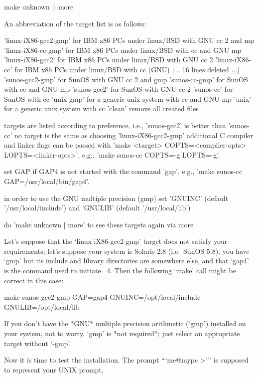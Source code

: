 \begintt
make unknown || more
\endtt

An abbreviation of the target list is as follows:

\begintt
'linux-iX86-gcc2-gmp'      for IBM x86 PCs under linux/BSD with GNU cc 2 and mp
'linux-iX86-cc-gmp'        for IBM x86 PCs under linux/BSD with cc and GNU mp
'linux-iX86-gcc2'          for IBM x86 PCs under linux/BSD with GNU cc 2
'linux-iX86-cc'            for IBM x86 PCs under linux/BSD with cc (GNU)
[... 16 lines deleted ...]
'sunos-gcc2-gmp'           for SunOS with GNU cc 2 and gmp
'sunos-cc-gmp'             for SunOS with cc and GNU mp
'sunos-gcc2'               for SunOS with GNU cc 2
'sunos-cc'                 for SunOS with cc
'unix-gmp'                 for a generic unix system with cc and GNU mp
'unix'                     for a generic unix system with cc
'clean'                    remove all created files

   targets are listed according to preference,
   i.e., 'sunos-gcc2' is better than 'sunos-cc'
   no target is the same as choosing 'linux-iX86-gcc2-gmp'
   additional C compiler and linker flags can be passed with
   'make <target> COPTS=<compiler-opts> LOPTS=<linker-opts>',
   e.g., 'make sunos-cc COPTS=-g LOPTS=-g'.

   set GAP if GAP4 is not started with the command 'gap',
   e.g., 'make sunos-cc GAP=/usr/local/bin/gap4'.

   in order to use the GNU multiple precision (gmp) set
   'GNUINC' (default '/usr/local/include') and 
   'GNULIB' (default '/usr/local/lib')

   do 'make unknown | more' to see these targets again via more
\endtt

Let's suppose that the  `linux-iX86-gcc2-gmp'  target  does  not  satisfy  your
requirements; let's suppose your system is Solaris 2.8 (i.e.~SunOS  5.8),
you have `gmp' but its include  and  library  directories  are  somewhere
else, and that `gap4' is the command used to initiate  {\GAP}~4.  Then  the
following `make' call might be correct in this case:

\begintt
make sunos-gcc2-gmp GAP=gap4 GNUINC=/opt/local/include GNULIB=/opt/local/lib
\endtt

If you  don't  have  the  *GNU*  multiple  precision  arithmetic  (`gmp')
installed on your system, not to worry, `gmp'  is  *not  required*;  just
select an appropriate target without `-gmp'.

Now it is time to test the installation. The  prompt  ```me@mypc >'''  is
supposed to represent your UNIX prompt.

